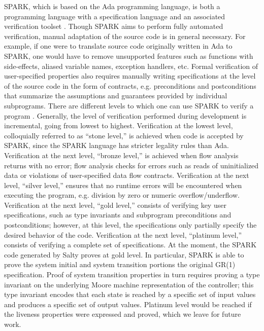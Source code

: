 \documentclass[runningheads]{llncs}
\begin{document}
SPARK, which is based on the Ada programming language, is both a programming language 
with a specification language and an associated verification toolset \cite{hoang2015spark}.
Though SPARK aims to perform fully automated verification, manual adaptation of the source code is in general necessary. 
For example, if one were to translate source code originally written in Ada to SPARK, 
one would have to remove unsupported features such as functions with side-effects, aliased variable names, exception handlers, etc.  
Formal verification of user-specified properties also requires manually writing specifications at the level of the source code in the 
form of contracts, e.g. preconditions and postconditions that summarize the assumptions and guarantees provided by individual subprograms.
There are different levels to which one can use SPARK to verify a program \cite{moy2019climbing}. 
Generally, the level of verification performed during development is incremental, going from lowest to highest. 
Verification at the lowest level, colloquially referred to as ``stone level,'' is achieved when code is accepted by SPARK, 
since the SPARK language has stricter legality rules than Ada. 
Verification at the next level, ``bronze level,'' is achieved when flow analysis returns with no error; 
flow analysis checks for errors such as reads of uninitialized data or violations of user-specified data flow contracts. 
Verification at the next level, ``silver level,'' ensures that no runtime errors will be encountered when executing the program, 
e.g. division by zero or numeric overflow/underflow. 
Verification at the next level, ``gold level,''  consists of verifying key user specifications, such as 
type invariants and subprogram preconditions and postconditions; 
however, at this level, the specifications only partially specify the desired behavior of the code.  
Verification at the next level, ``platinum level,'' consists of verifying a complete set of specifications.
At the moment, the SPARK code generated by Salty proves at gold level.
In particular, SPARK is able to prove the system initial and system transition portions the original GR(1) specification. 
Proof of system transition properties in turn requires proving a type invariant on the underlying Moore machine representation of the controller; 
this type invariant encodes that each state is reached by a specific set of input values and produces a specific set of output values. 
Platinum level would be reached if the liveness properties were expressed and proved, 
which we leave for future work.
\end{document}
